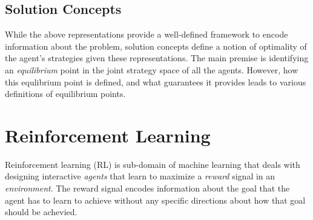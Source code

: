 \begin{definition}
\end{definition}


\subsection{Solution Concepts}
While the above representations provide a well-defined framework to encode information about the
problem, solution concepts define a notion of optimality of the agent's strategies given these
representations.
The main premise is identifying an \textit{equilibrium} point in the joint strategy space of all
the agents.
However, how this equlibrium point is defined, and what guarantees it provides leads to various
definitions of equilibrium points.



\section{Reinforcement
  Learning}
Reinforcement learning (RL) is sub-domain of machine learning that deals with designing interactive
\textit{agents} that learn to maximize a \textit{reward} signal in an \textit{environment}.
The reward signal encodes information about the goal that the agent has to learn to achieve without
any specific directions about how that goal should be achevied.

